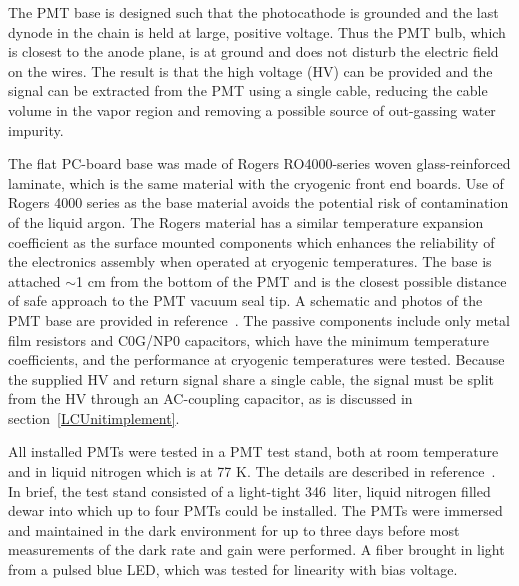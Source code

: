 The PMT base is designed such that the photocathode is 
grounded and the last dynode in the chain is held at large, positive voltage. 
Thus the PMT bulb, which is closest to the \lartpc anode plane, 
is at ground and does not disturb the electric field on the wires.  
The result is that the high voltage (HV) can be provided and the signal can be extracted from the PMT using a single cable, 
reducing the cable volume in the vapor region and removing a possible source of out-gassing water impurity.

The flat PC-board base was made of Rogers RO4000-series woven glass-reinforced laminate, 
which is the same material with the \lartpc cryogenic front end boards.  Use of Rogers 4000 series as the base material avoids the potential risk of contamination of the liquid argon. The Rogers material has a similar temperature expansion coefficient as the surface mounted components which enhances the reliability of the electronics assembly when operated at cryogenic temperatures.  The base is attached $\sim$1 cm from the bottom of the PMT and is the closest possible distance of safe approach to the PMT vacuum seal tip.   
A schematic and photos of the PMT base are provided in reference~\cite{Briese:2013wua}. 
The passive components include only metal film resistors and C0G/NP0 capacitors, 
which have the minimum temperature coefficients, and the performance at cryogenic temperatures were tested.  
Because the supplied HV and return signal share a single cable, the signal must be split from the HV through an AC-coupling capacitor, as is discussed in section~\ref{LCUnitimplement}.

All installed PMTs were tested in a PMT test stand, both
at room temperature and in liquid nitrogen which is at 77 K.  
The details are described in reference~\cite{Briese:2013wua}.  
In brief, the test stand consisted of a light-tight 346~liter, 
liquid nitrogen filled dewar into which up to four PMTs could be installed. 
The PMTs were immersed and maintained in the dark environment 
for up to three days before most measurements of the dark rate and gain were performed.  
A fiber brought in light from a pulsed blue LED, which was tested for linearity with bias voltage.  


